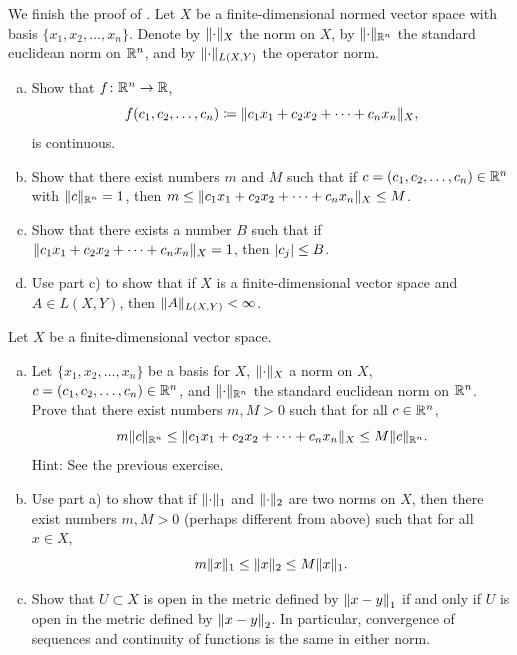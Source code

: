 \begin{exercise}
\pagebreak[1]
We finish the proof of .
Let $X$ be a finite-dimensional normed vector space with basis
$\{ x_1,x_2,\ldots,x_n \}$.  Denote by $\lVert {\cdot} \rVert_X$ the norm on $X$,
by $\lVert {\cdot} \rVert_{{\mathbb{R}}^n}$ the standard euclidean norm on ${\mathbb{R}}^n$, and
by $\lVert {\cdot} \rVert_{L(X,Y)}$ the operator norm.
\begin{enumerate}[a)]
\item
Show that $f \colon {\mathbb{R}}^n \to {\mathbb{R}}$,
\begin{equation*}
f(c_1,c_2,\ldots,c_n) \coloneqq 
\lVert {c_1 x_1 + c_2 x_2 + \cdots + c_n x_n} \rVert_X ,
\end{equation*}
is continuous.
\item
Show that there exist numbers $m$ and $M$ such
that if $c = (c_1,c_2,\ldots,c_n) \in {\mathbb{R}}^n$ with
$\lVert {c} \rVert_{{\mathbb{R}}^n} = 1$, then 
$m \leq \lVert {c_1 x_1 + c_2 x_2 + \cdots + c_n x_n} \rVert_X \leq M$.
\item
Show that there exists a number $B$ such that if
$\lVert {c_1 x_1 + c_2 x_2 + \cdots + c_n x_n} \rVert_X = 1$,
then $\lvert {c_j} \rvert \leq B$.
\item
Use part c) to show that if $X$ is a finite-dimensional vector 
space and $A \in L(X,Y)$, then $\lVert {A} \rVert_{L(X,Y)} < \infty$.
\end{enumerate}
\end{exercise}

\begin{exercise} \label{exercise:allnormsequiv}
\pagebreak[3]
Let $X$ be a finite-dimensional vector space.
\begin{enumerate}[a)]
\item
Let $\{ x_1,x_2,\ldots,x_n \}$ be a basis for $X$,
$\lVert {\cdot} \rVert_X$ a norm on $X$,
$c = (c_1,c_2,\ldots,c_n) \in {\mathbb{R}}^n$,
and $\lVert {\cdot} \rVert_{{\mathbb{R}}^n}$ the
standard euclidean norm on ${\mathbb{R}}^n$.
Prove that there exist numbers $m,M > 0$ such that
for all $c \in {\mathbb{R}}^n$,
\begin{equation*}
m \lVert {c} \rVert_{{\mathbb{R}}^n}
\leq
\lVert {c_1 x_1 + c_2 x_2 + \cdots + c_n x_n} \rVert_X
\leq
M \lVert {c} \rVert_{{\mathbb{R}}^n} .
\end{equation*}
Hint: See the previous exercise.
\item
Use part a) to show that if
$\lVert {\cdot} \rVert_1$ and
$\lVert {\cdot} \rVert_2$ are two norms on $X$, then there exist
numbers $m,M > 0$ (perhaps different from above) such that
for all $x \in X$,
\begin{equation*}
m \lVert {x} \rVert_1
\leq
\lVert {x} \rVert_2
\leq
M \lVert {x} \rVert_1 .
\end{equation*}
\item
Show that $U \subset X$ is open in the metric defined by
$\left\lVert {x-y} \right\rVert_1$ if and only if $U$ is open in the metric defined by
$\left\lVert {x-y} \right\rVert_2$.  In particular, convergence of sequences and continuity
of functions is the same in either norm.
\end{enumerate}
\end{exercise}

